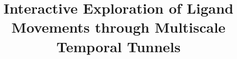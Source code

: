 \documentclass[twocolumn]{bmcart}%
\begin{document}
\begin{frontmatter}

\begin{fmbox}


\title{Interactive Exploration of Ligand Movements through Multiscale Temporal Tunnels}

\author[
   addressref={aff1},
   email={furmanova@mail.muni.cz}
]{ }
\author[
   addressref={aff1},                   %
   email={jaresova@mail.muni.cz}   %
]{ }
\author[
   addressref={aff1,aff2},                   %
   email={xbyska@fi.muni.cz}   %
]{ }
\author[
   addressref={aff1},                   %
   email={xjurc@fi.muni.cz}   %
]{ }
\author[
   addressref={aff2},                   %
   email={julius.parulek@uib.no}   %
]{ }
\author[
   addressref={aff2},                   %
   email={Helwig.Hauser@uib.no}   %
]{ }
\author[
   addressref={aff1},                   %
   email={kozlikova@fi.muni.cz}   %
]{ }



\end{fmbox}
\end{frontmatter}
\end{document}
